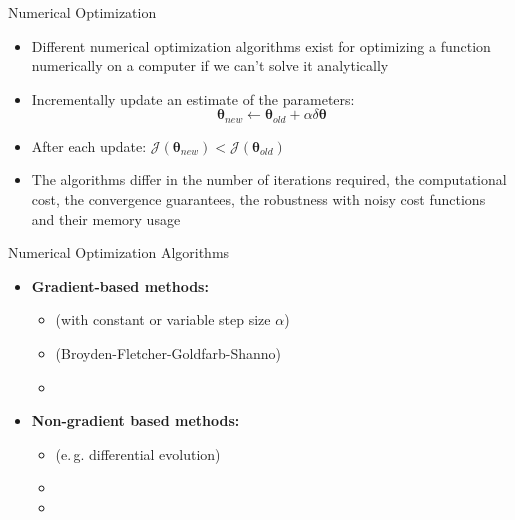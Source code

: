 \begin{frame}{Numerical Optimization}{}\important
	\begin{itemize}
		\item Different numerical optimization algorithms exist for optimizing a function numerically on a computer if we can't solve it analytically
		\item {} Incrementally update an estimate of the parameters:
		\begin{equation}
			\bm{\theta}_{new} \longleftarrow \bm{\theta}_{old} + \alpha \delta \bm{\theta}
		\end{equation}
		\item After each update: $\mathcal{J}(\bm{\theta}_{new}) < \mathcal{J}(\bm{\theta}_{old})$
		\item The algorithms differ in the number of iterations required, the computational cost, the convergence guarantees,
			the robustness with noisy cost functions and their memory usage
	\end{itemize}
\end{frame}

\begin{frame}{Numerical Optimization Algorithms}{}
	\begin{itemize}
		\item \textbf{Gradient-based methods:}
		\begin{itemize}
			\item {} (with constant or variable step size $\alpha$)
			\item {} (Broyden-Fletcher-Goldfarb-Shanno)
			\item {}
		\end{itemize}
		\item \textbf{Non-gradient based methods:}
		\begin{itemize}
			\item {} (e.\,g. differential evolution)
			\item {}
			\item {}
		\end{itemize}
	\end{itemize}
	
	\begin{boxBlueNoFrame}
	\end{boxBlueNoFrame}
\end{frame}


